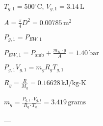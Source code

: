 \( T_{g,1} = 500^\circ \text{C} \), \( V_{g,1} = 3.14 \, \text{L} \)  

\( A = \frac{\pi}{4} D^2 = 0.00785 \, \text{m}^2 \)  

\( P_{g,1} = P_{EW,1} \)  

\( P_{EW,1} = P_{\text{amb}} + \frac{m_K \cdot g}{A} = 1.40 \, \text{bar} \)  

\( P_{g,1} V_{g,1} = m_g R_g T_{g,1} \)  

\( R_g = \frac{R}{M_g} = 0.16628 \, \text{kJ/kg·K} \)  

\( m_g = \frac{P_{g,1} \cdot V_{g,1}}{R_g \cdot T_{g,1}} = 3.419 \, \text{grams} \)  

---